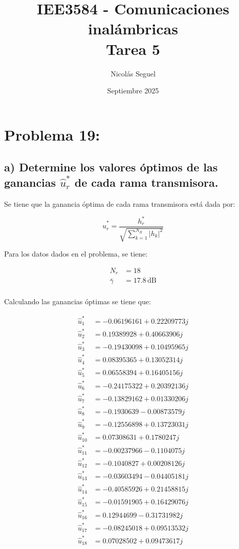 \documentclass[11pt]{article}
\title{IEE3584 - Comunicaciones inalámbricas \\
Tarea 5}
\author{Nicolás Seguel}
\date{Septiembre 2025}
\begin{document}
\maketitle

\section*{Problema 19:}

\subsection*{a) Determine los valores óptimos de las ganancias $\hat{u}_r^*$ de cada rama transmisora.}

Se tiene que la ganancia óptima de cada rama transmisora está dada por:

\[
\hat{u}_r^* = \frac{h_r^*}{\sqrt{\sum_{k=1}^{N_R} |h_k|^2}}
\]

Para los datos dados en el problema, se tiene:

\begin{align*}
    N_r &= 18 \\
    \bar{\gamma} &= 17.8 \, \text{dB} \\
\end{align*}

Calculando las ganancias óptimas se tiene que:

\begin{align*}
    \hat{u}_1^* &= -0.06196161+0.22209773j  \\
    \hat{u}_2^* &= 0.19389928+0.40663906j \\
    \hat{u}_3^* &= -0.19430098+0.10495965j \\
    \hat{u}_4^* &= 0.08395365+0.13052314j \\
    \hat{u}_5^* &= 0.06558394+0.16405156j \\
    \hat{u}_6^* &= -0.24175322+0.20392136j \\
    \hat{u}_7^* &= -0.13829162+0.01330206j \\
    \hat{u}_8^* &= -0.1930639 -0.00873579j \\
    \hat{u}_9^* &= -0.12556898+0.13723031j \\
    \hat{u}_{10}^* &= 0.07308631+0.1780247j \\
    \hat{u}_{11}^* &= -0.00237966-0.1104075j \\
    \hat{u}_{12}^* &= -0.1040827 +0.00208126j \\
    \hat{u}_{13}^* &= -0.03603494-0.04405181j \\
    \hat{u}_{14}^* &= -0.40585926+0.21458815j \\
    \hat{u}_{15}^* &= -0.01591905+0.16429076j \\
    \hat{u}_{16}^* &= 0.12944699-0.31731982j \\
    \hat{u}_{17}^* &= -0.08245018+0.09513532j \\
    \hat{u}_{18}^* &= 0.07028502+0.09473617j
\end{align*}
\end{document}
